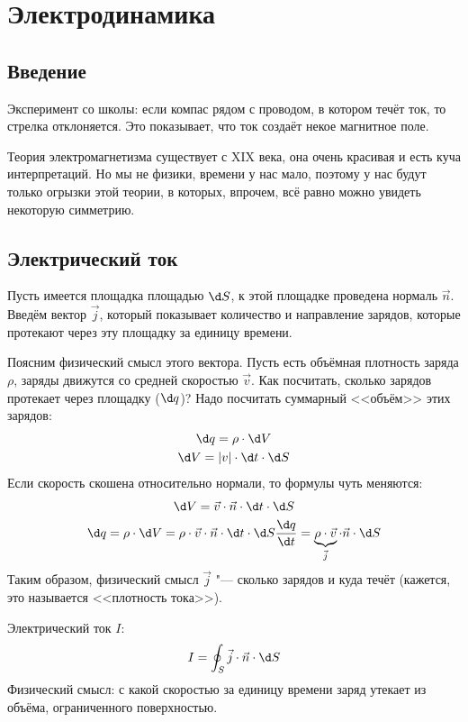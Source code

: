 \chapter{Электродинамика}

\section{Введение}
  Эксперимент со школы: если компас рядом с проводом, в котором течёт ток, то стрелка отклоняется.
  Это показывает, что ток создаёт некое магнитное поле.

  Теория электромагнетизма существует с XIX века, она очень красивая и есть куча интерпретаций.
  Но мы не физики, времени у нас мало, поэтому у нас будут только огрызки этой теории, в которых,
  впрочем, всё равно можно увидеть некоторую симметрию.

\section{Электрический ток}
  Пусть имеется площадка площадью $\d S$, к этой площадке проведена нормаль $\vec n$.
  Введём вектор $\vec j$, который показывает количество и направление зарядов,
  которые протекают через эту площадку за единицу времени.

  Поясним физический смысл этого вектора.
  Пусть есть объёмная плотность заряда $\rho$, заряды движутся со средней скоростью $\vec v$.
  Как посчитать, сколько зарядов протекает через площадку ($\d q$)?
  Надо посчитать суммарный <<объём>> этих зарядов:
  \begin{gather*}
    \d q = \rho \cdot \d V \\
    \d V = |v| \cdot \d t \cdot \d S
  \end{gather*}
  Если скорость скошена относительно нормали, то формулы чуть меняются:
  \begin{gather*}
    \d V = \vec v \cdot \vec n \cdot \d t \cdot \d S \\
    \d q = \rho \cdot \d V = \rho \cdot \vec v \cdot \vec n \cdot \d t \cdot \d S
    \frac{\d q}{\d t} = \underbrace{\rho \cdot \vec v}_{\vec j} \cdot \vec n \cdot \d S
  \end{gather*}
  Таким образом, физический смысл $\vec j$ "--- сколько зарядов и куда течёт (кажется, это называется <<плотность тока>>).

  \begin{Def}
    Электрический ток $I$:
    \[ I = \oint_S \vec j \cdot \vec n \cdot \d S\]
    Физический смысл: с какой скоростью за единицу времени заряд утекает из объёма, ограниченного поверхностью.
  \end{Def}


